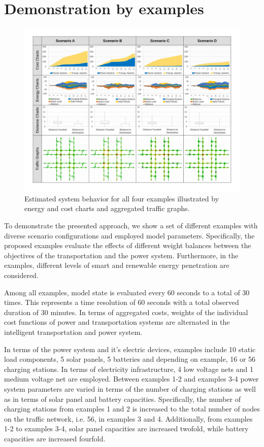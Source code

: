 \section{Demonstration by examples}
\label{section:evaluation}

\begin{figure}[b]
	\centering
	\includegraphics[width=\textwidth]{../gfx/examples2.pdf}
	\caption{Estimated system behavior for all four examples illustrated by energy and cost charts and aggregated traffic graphs.}
	\label{figure:examples}
\end{figure}

To demonstrate the presented approach, we show a set of different examples with diverse scenario configurations and employed model parameters. Specifically, the proposed examples evaluate the effects of different weight balances between the objectives of the transportation and the power system. 
Furthermore, in the examples, different levels of smart and renewable energy penetration are considered. 

Among all examples, model state is evaluated every 60 seconds to a total of 30 times. This represents a time resolution of 60 seconds with a total observed duration of 30 minutes. 
In terms of aggregated costs, weights of the individual cost functions of power and transportation systems are alternated in the intelligent transportation and power system.

In terms of the power system and it's electric devices, examples include 10 static load components, 5 solar panels, 5 batteries and depending on example, 16 or 56 charging stations. In terms of electricity infrastructure, 4 low voltage nets and 1 medium voltage net are employed. Between examples 1-2 and examples 3-4 power system parameters are varied in terms of the number of charging stations as well as in terms of solar panel and battery capacities. Specifically, the number of charging stations from examples 1 and 2 is increased to the total number of nodes on the traffic network, i.e. 56, in examples 3 and 4. Additionally, from examples 1-2 to examples 3-4, solar panel capacities are increased twofold, while battery capacities are increased fourfold. 

